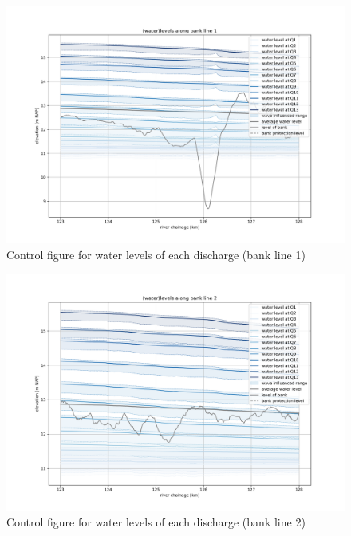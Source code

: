 \begin{figure}
\includegraphics[width=\textwidth]{figures/6_levels_bank_1.png}
\caption{Control figure for water levels of each discharge (bank line 1)}
\label{Fig2.8}
\end{figure}
\clearpage
\begin{figure}
\includegraphics[width=\textwidth]{figures/7_levels_bank_2.png}
\caption{Control figure for water levels of each discharge (bank line 2)}
\label{Fig2.9}
\end{figure}

